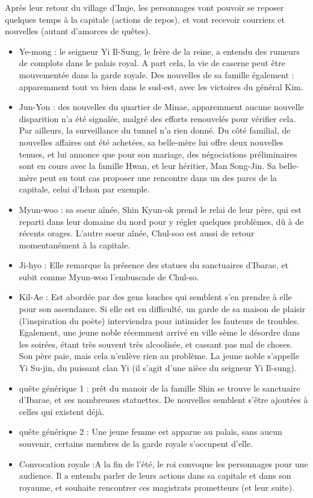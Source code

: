 \documentclass[10pt,a4paper]{book}
\begin{document}
Après leur retour du village d'Imje, les personnages vont pouvoir se reposer quelques temps à la capitale (actions de repos), et vont recevoir courriers et nouvelles (autant d'amorces de quêtes).
\begin{itemize}
\item Ye-mong : le seigneur Yi Il-Sung, le frère de la reine, a entendu des rumeurs de complots dans le palais royal. A part cela, la vie de caserne peut être mouvementée dans la garde royale. Des nouvelles de sa famille également : apparemment tout va bien dans le sud-est, avec les victoires du général Kim.
\item Jun-Yon : des nouvelles du quartier de Minae, apparemment aucune nouvelle disparition n'a été signalée, malgré des efforts renouvelés pour vérifier cela. Par ailleurs, la surveillance du tunnel n'a rien donné. Du côté familial, de nouvelles affaires ont été achetées, sa belle-mère lui offre deux nouvelles tenues, et lui annonce que pour son mariage, des négociations préliminaires sont en cours avec la famille Hwan, et leur héritier, Man Song-Jin. Sa belle-mère peut en tout cas proposer une rencontre dans un des parcs de la capitale, celui d'Ichon par exemple.
\item Myun-woo : sa soeur aînée, Shin Kyun-ok prend le relai de leur père, qui est reparti dans leur domaine du nord pour y régler quelques problèmes, dû à de récents orages. L'autre soeur aînée, Chul-soo est aussi de retour momentanément à la capitale.
\item Ji-hyo : Elle remarque la présence des statues du sanctuaires d'Ibarae, et subit comme Myun-woo l'embuscade de Chul-so. 
\item Kil-Ae : Est abordée par des gens louches qui semblent s'en prendre à elle pour son ascendance. Si elle est en difficulté, un garde de sa maison de plaisir (l'inspiration du poète) interviendra pour intimider les fauteurs de troubles. Egalement, une jeune noble récemment arrivé en ville sème le désordre dans les soirées, étant très souvent très alcoolisée, et cassant pas mal de choses. Son père paie, mais cela n'enlève rien au problème. La jeune noble s'appelle Yi Su-jin, du puissant clan Yi (il s'agit d'une nièce du seigneur Yi Il-sung).
\item quête générique 1 : prêt du manoir de la famille Shin se trouve le sanctuaire d'Ibarae, et ses nombreuses statuettes. De nouvelles semblent s'être ajoutées à celles qui existent déjà.
\item quête générique 2 : Une jeune femme est apparue au palais, sans aucun souvenir, certains membres de la garde royale s'occupent d'elle.
\item Convocation royale :A la fin de l'été, le roi convoque les personnages pour une audience. Il a entendu parler de leurs actions dans sa capitale et dans son royaume, et souhaite rencontrer ces magistrats prometteurs (et leur suite).
\end{itemize}
\end{document}
